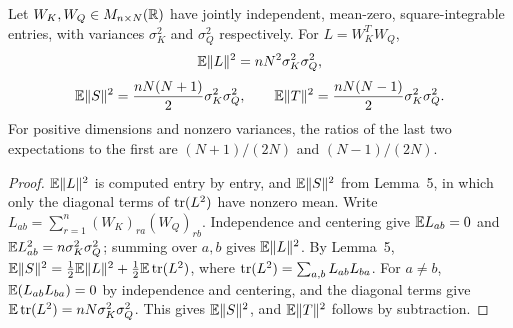 \begin{corollary}
\label{cor:qk}
\leanok
{}
Let $W_K,W_Q\in M_{n\times N}(\mathbb{R})$ have jointly independent,
mean-zero, square-integrable entries, with variances $\sigma_K^2$ and
$\sigma_Q^2$ respectively. For $L=W_K^TW_Q$,
\[
 \mathbb{E}\lVert L\rVert^2=nN^2\sigma_K^2\sigma_Q^2,
\]
\[
 \mathbb{E}\lVert S\rVert^2=\frac{nN(N+1)}2\sigma_K^2\sigma_Q^2,\qquad
 \mathbb{E}\lVert T\rVert^2=\frac{nN(N-1)}2\sigma_K^2\sigma_Q^2.
\]
For positive dimensions and nonzero variances, the ratios of the last
two expectations to the first are $(N+1)/(2N)$ and $(N-1)/(2N)$.
\end{corollary}
\begin{proof}
\leanok
{}
$\mathbb{E}\lVert L\rVert^2$ is computed entry by entry, and $\mathbb{E}\lVert S\rVert^2$ from Lemma~5,
in which only the diagonal terms of $\operatorname{tr}(L^2)$ have nonzero mean. Write
$L_{ab}=\sum_{r=1}^n(W_K)_{ra}(W_Q)_{rb}$. Independence and centering
give $\mathbb{E} L_{ab}=0$ and $\mathbb{E} L_{ab}^2=n\sigma_K^2\sigma_Q^2$; summing over
$a,b$ gives $\mathbb{E}\lVert L\rVert^2$. By Lemma~5,
$\mathbb{E}\lVert S\rVert^2=\tfrac12\mathbb{E}\lVert L\rVert^2+\tfrac12\mathbb{E}\operatorname{tr}(L^2)$, where
$\operatorname{tr}(L^2)=\sum_{a,b}L_{ab}L_{ba}$. For $a\ne b$,
$\mathbb{E}(L_{ab}L_{ba})=0$ by independence and centering, and the diagonal terms
give $\mathbb{E}\operatorname{tr}(L^2)=nN\sigma_K^2\sigma_Q^2$. This gives $\mathbb{E}\lVert S\rVert^2$, and
$\mathbb{E}\lVert T\rVert^2$ follows by subtraction.
\end{proof}

